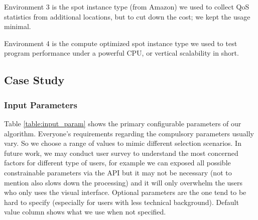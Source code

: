 Environment 3 is the spot instance type (from Amazon) we used to collect QoS statistics from additional locations, but to cut down the cost; we kept the usage minimal.

Environment 4 is the compute optimized spot instance type we used to test program performance under a powerful CPU, or vertical scalability in short.

\subsection{Case Study}
\subsubsection{Input Parameters}
Table \ref{table:input_param} shows the primary configurable parameters of our algorithm. Everyone's requirements regarding the compulsory parameters usually vary. So we choose a range of values to mimic different selection scenarios. In future work, we may conduct user survey to understand the most concerned factors for different type of users, for example we can exposed all possible constrainable parameters via the API but it may not be necessary (not to mention also slows down the processing) and it will only overwhelm the users who only uses the visual interface. Optional parameters are the one tend to be hard to specify (especially for users with less technical background). Default value column shows what we use when not specified.

